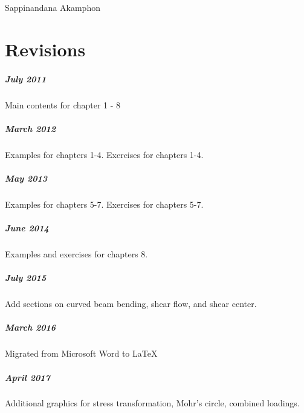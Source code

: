 \documentclass[
10pt,
a4paper,
openany,
svgnames,
]{book} %
\begin{document}
\vspace{3cm} \hspace{9cm}
Sappinandana Akamphon

\chapter*{Revisions}

\paragraph{July 2011}

Main contents for chapter 1 - 8

\paragraph{March 2012}

Examples for chapters 1-4. Exercises for chapters 1-4.

\paragraph{May 2013}

Examples for chapters 5-7. Exercises for chapters 5-7.

\paragraph{June 2014}

Examples and exercises for chapters 8.

\paragraph{July 2015}

Add sections on curved beam bending, shear flow, and shear center.

\paragraph{March 2016}

Migrated from Microsoft Word to \LaTeX\

\paragraph{April 2017}

Additional graphics for stress transformation, Mohr's circle, combined loadings.
\end{document}
